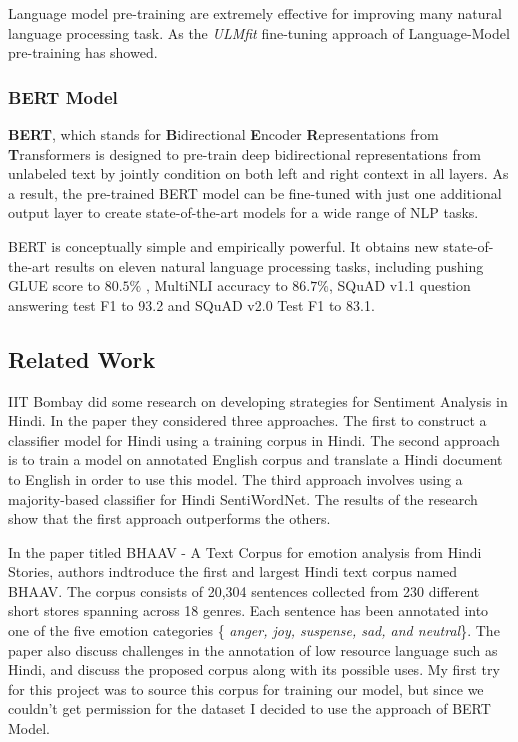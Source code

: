 \documentclass[a4paper, 12pt]{article}
\begin{document}
\begin{sloppypar}
Language model pre-training are extremely effective for improving many natural language processing task. As the \textit{ULMfit} fine-tuning approach of Language-Model pre-training has showed. %

\subsubsection{BERT Model}

\textbf{BERT}, which stands for \textbf{B}idirectional  \textbf{E}ncoder  \textbf{R}epresentations from  \textbf{T}ransformers is designed to pre-train deep bidirectional representations from unlabeled text by jointly condition on both left and right context in all layers. As a result, the pre-trained BERT model can be fine-tuned with just one additional output layer to create state-of-the-art models for a wide range of NLP tasks. %

BERT is conceptually simple and empirically powerful. It obtains new state-of-the-art results on eleven natural language processing tasks, including pushing GLUE %
score to $80.5 \%$ , MultiNLI %
accuracy to $86.7\%$, SQuAD v1.1 %
question answering test F1 to 93.2  and SQuAD v2.0 %
Test F1 to 83.1. %

\subsection{Related Work}

IIT Bombay did some research on developing strategies  for Sentiment Analysis in Hindi.  In the paper they considered three approaches. The first to construct a classifier model for Hindi using a training corpus in Hindi. The second approach is to train a model on annotated English corpus and translate a Hindi document to English in order to use this model. The third approach involves using a majority-based classifier for Hindi SentiWordNet. The results of the research show that the first approach outperforms the others. %

In the paper titled BHAAV - A Text Corpus for emotion analysis from Hindi Stories, authors indtroduce the first and largest Hindi text corpus named BHAAV. The corpus consists of 20,304 sentences collected from 230 different short stores spanning across 18 genres. Each sentence has been annotated into one of the five emotion categories \{ \textit{anger, joy, suspense, sad, and neutral}\}. The paper also discuss challenges in the annotation of low resource language such as Hindi, and discuss the proposed corpus along with its possible uses. %
My first try for this project was to source this corpus for training our model, but since we couldn't get permission for the dataset I decided to use the approach of BERT Model.
\clearpage
\printbibliography
\clearpage

\end{sloppypar}
\end{document}
